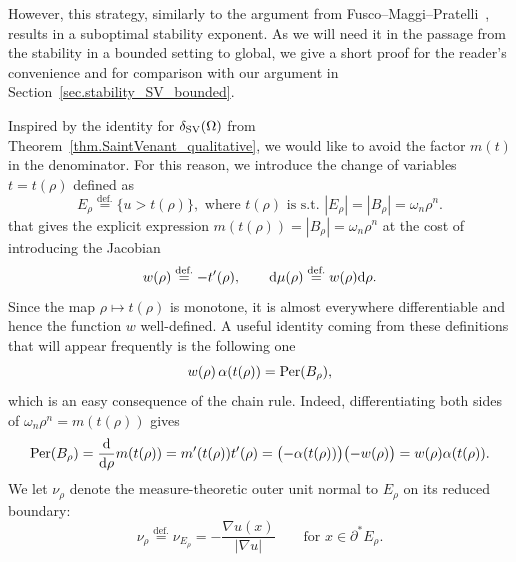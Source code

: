 \documentclass[11pt]{amsart}
\theoremstyle{plain}
\theoremstyle{definition}
\newcommand{\eqdef}{\overset{\text{def.}}{=}}
\def\dd{{\rm d}}
\newcommand\Per{\mathop{\rm Per}}
\newcommand\SV{\mathop{\rm SV}}
\begin{document}
However, this strategy, similarly to the argument from Fusco--Maggi--Pratelli~\cite{FuscoMaggiPratelli2009Eigenvalue}, results in a suboptimal stability exponent. As we will need it in the passage from the stability in a bounded setting to global, we give a short proof for the reader's convenience and for comparison with our argument in Section~\ref{sec.stability_SV_bounded}.


Inspired by the identity for $\delta_{\SV}(\Omega)$ from Theorem~\ref{thm.SaintVenant_qualitative}, we would like to avoid the factor $m(t)$ in the denominator. For this reason, we introduce the change of variables $t=t(\rho)$ defined as
\begin{equation}\label{eq.change_var_t_rho}
    E_\rho \eqdef \{u>t(\rho)\},
    \text{ where $t(\rho)$ is s.t. }
    |E_\rho|=|B_\rho|=\omega_n\rho^n.
\end{equation}
that gives the explicit expression $m(t(\rho))=|B_\rho|=\omega_n\rho^n$ at the cost of introducing the Jacobian
\begin{equation}\label{eq.change_var_jacobian}
    w(\rho)\eqdef -t'(\rho),\qquad \dd \mu(\rho)\eqdef w(\rho)\dd\rho .
\end{equation}
Since the map $\rho \mapsto t(\rho)$ is monotone, it is almost everywhere differentiable and hence the function $w$ well-defined. A useful identity coming from these definitions that will appear frequently is the following one
\begin{equation}\label{eq.w_alpha_P_identity}
    w(\rho)\,\alpha(t(\rho))=\Per(B_\rho),
\end{equation}
which is an easy consequence of the chain rule. Indeed, differentiating both sides of
$\omega_n \rho^n=m(t(\rho))$ gives
\begin{align*}
  \Per(B_\rho)
  =
  \frac{\dd}{\dd\rho}m(t(\rho))
  =m'(t(\rho)) t'(\rho)
  =\bigl(-\alpha(t(\rho))\bigr)\bigl(-w(\rho)\bigr)
  =w(\rho)\alpha(t(\rho)).
\end{align*}
We let $\nu_\rho$ denote the measure-theoretic outer unit normal to $E_\rho$
on its reduced boundary:
\[
  \nu_\rho\eqdef
  \nu_{E_\rho}=-\frac{\nabla u(x)}{|\nabla u|}\qquad\text{for }x\in\partial^* E_\rho.
\]
\end{document}
